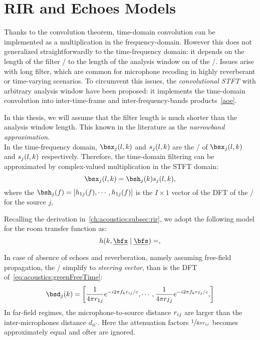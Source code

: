 \section{RIR and Echoes Models}
Thanks to the convolution theorem, time-domain convolution can be implemented as a multiplication in the frequency-domain.
However this does not generalized straightforwardly to the time-frequency domain:
it depends on the length of the filter \wrt/ to the length of the analysis window on of the \STFT/.
Issues arise with long filter, which are common for microphone recoding in highly reverberant or time-varying scenarios.
To circumvent this issues, the \textit{convolutional STFT} with arbitrary analysis window have been proposed:
it implements the time-domain convolution into inter-time-frame and inter-frequency-bands products~\cref{aoe}.

In this thesis, we will assume that the filter length is much shorter than the analysis window length.
This known in the literature as the \textit{narrowband approximation}\cite{}.
\\In the time-frequency domain, $\mics_j(l,k)$  and $s_j(l,k)$ are the \STFT/ of $\mics_j(l,k)$ and $s_j(l,k)$ respectively.
Therefore, the time-domain filtering can be approximated by complex-valued multiplication in the STFT domain:
\begin{equation}
    \mics_j(l,k) = \bsh_j(k) \src_j(l,k)
    ,
\end{equation}
where the $\bsh_j(f) = \klist{h_{1j}(f), \cdots, h_{1j}(f)}$ is the $I \times 1$ vector of the DFT of the
\RIRs/ for the source $j$,

Recalling the derivation in~\cref{ch:acoustics:subsec:rir}, we adopt the following model for the room transfer function as:
\begin{equation}
    \rir (k, \positionMicrophone \mid \positionSource) =
    ,
\end{equation}

In case of absence of echoes and reverberation, namely assuming free-field propagation,
the \RIRs/ simplify to \textit{steering vector}, than is the DFT of~\cref{eq:acoustics:greenFreeTime}:
\begin{equation}\label{eq:processing:steering}
    \bsd_{j}(k) = \klist{\frac{1}{4 \pi \distMicSrc_{1j}} \cste^{-\csti 2 \pi f_k \distMicSrc_{ij} / c},
                            \cdots,
                            \frac{1}{4 \pi \distMicSrc_{Ij}} \cste^{-\csti 2 \pi f_k \distMicSrc_{Ij} / c},
                    }
\end{equation}
In far-field regimes, the microphone-to-source distance $r_{ij}$ are larger than the
inter-microphones distance $d_{ii'}$. Here the attenuation factors $\sfrac{1}{4 \pi r_{ij}}$ becomes approximately equal
and ofter are ignored.


